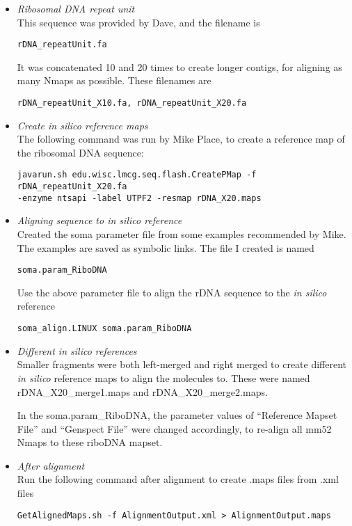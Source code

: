 \documentclass[11pt]{article}
\begin{document}
\begin{enumerate}
\begin{itemize}
\item \emph{Ribosomal DNA repeat unit} \\
This sequence was provided by Dave, and the filename is 
\begin{verbatim}
rDNA_repeatUnit.fa
\end{verbatim}
It was concatenated 10 and 20 times to create longer contigs, for aligning as many Nmaps as possible. These filenames are 
\begin{verbatim}
rDNA_repeatUnit_X10.fa, rDNA_repeatUnit_X20.fa
\end{verbatim}

\item \emph{Create in silico reference maps} \\
The following command was run by Mike Place, to create a reference map of the ribosomal DNA sequence:
\begin{verbatim}
javarun.sh edu.wisc.lmcg.seq.flash.CreatePMap -f rDNA_repeatUnit_X20.fa 
-enzyme ntsapi -label UTPF2 -resmap rDNA_X20.maps
\end{verbatim}

\item \emph{Aligning sequence to in silico reference} \\
Created the soma parameter file from some examples recommended by Mike. The examples are saved as symbolic links. The file I created is named 
\begin{verbatim}
soma.param_RiboDNA
\end{verbatim}
Use the above parameter file to align the rDNA sequence to the {\emph{in silico}} reference
\begin{verbatim}
soma_align.LINUX soma.param_RiboDNA
\end{verbatim}

\item \emph{Different in silico references} \\
Smaller fragments were both left-merged and right merged to create different {\emph{in silico}} reference maps to align the molecules to. These were
 named rDNA\_X20\_merge1.maps and rDNA\_X20\_merge2.maps.

In the soma.param\_RiboDNA, the parameter values of ``Reference Mapset File'' and ``Genspect File'' were changed accordingly, to re-align all mm52 Nmaps to these riboDNA mapset.  

\item \emph{After alignment} \\
Run the following command after alignment to create .maps files from .xml files
\begin{verbatim}
GetAlignedMaps.sh -f AlignmentOutput.xml > AlignmentOutput.maps
\end{verbatim}


\end{itemize}
\end{enumerate}
\end{document}
